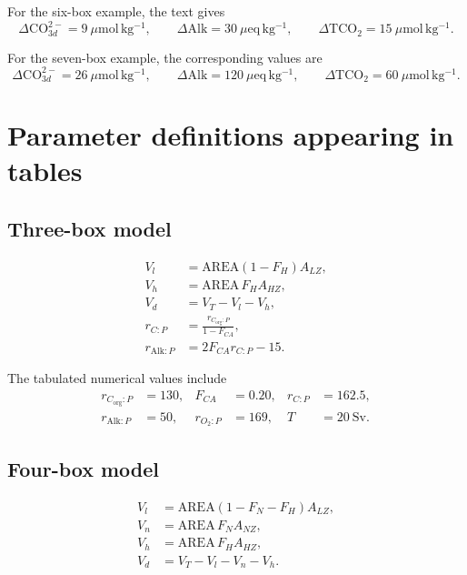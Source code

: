 \documentclass[11pt]{article}
\newcommand{\TCO}[1]{\mathrm{TCO}_{2#1}}
\newcommand{\COthree}[1]{\mathrm{CO}_{3#1}^{2-}}
\begin{document}
For the six-box example, the text gives
\begin{equation*}
\Delta\COthree{d}=9\ \mu\mathrm{mol\,kg^{-1}},
\qquad
\Delta\mathrm{Alk}=30\ \mu\mathrm{eq\,kg^{-1}},
\qquad
\Delta\TCO{}=15\ \mu\mathrm{mol\,kg^{-1}}.
\end{equation*}

For the seven-box example, the corresponding values are
\begin{equation*}
\Delta\COthree{d}=26\ \mu\mathrm{mol\,kg^{-1}},
\qquad
\Delta\mathrm{Alk}=120\ \mu\mathrm{eq\,kg^{-1}},
\qquad
\Delta\TCO{}=60\ \mu\mathrm{mol\,kg^{-1}}.
\end{equation*}

\section*{Parameter definitions appearing in tables}

\subsection*{Three-box model}

\begin{align*}
V_l &= \mathrm{AREA}(1-F_H)A_{LZ},\\
V_h &= \mathrm{AREA}\,F_H A_{HZ},\\
V_d &= V_T-V_l-V_h,\\
r_{C:P} &= \frac{r_{C_{\mathrm{org}}:P}}{1-F_{CA}},\\
r_{\mathrm{Alk}:P} &= 2F_{CA}r_{C:P}-15.
\end{align*}

The tabulated numerical values include
\begin{align*}
r_{C_{\mathrm{org}}:P}&=130, &
F_{CA}&=0.20, &
r_{C:P}&=162.5,\\
r_{\mathrm{Alk}:P}&=50, &
r_{O_2:P}&=169, &
T&=20\ \mathrm{Sv}.
\end{align*}

\subsection*{Four-box model}

\begin{align*}
V_l &= \mathrm{AREA}(1-F_N-F_H)A_{LZ},\\
V_n &= \mathrm{AREA}\,F_N A_{NZ},\\
V_h &= \mathrm{AREA}\,F_H A_{HZ},\\
V_d &= V_T-V_l-V_n-V_h.
\end{align*}
\end{document}
